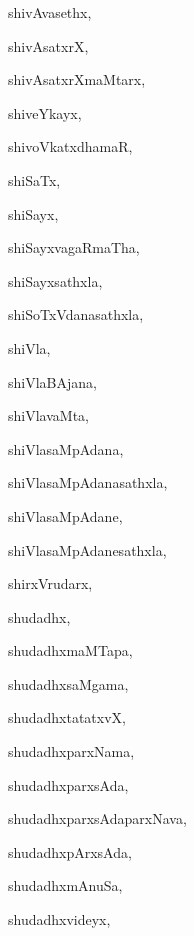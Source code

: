 \begin{multicols}{3}
{\noindent
{shivAvasethx}, \pageref{shivAvasethx}

\noindent
{shivAsatxrX}, \pageref{shivAsatxrX}

\noindent
{shivAsatxrXmaMtarx}, \pageref{shivAsatxrXmaMtarx}

\noindent
{shiveYkayx}, \pageref{shiveYkayx}

\noindent
{shivoVkatxdhamaR}, \pageref{shivoVkatxdhamaR}

\noindent
{shiSaTx}, \pageref{shiSaTx}

\noindent
{shiSayx}, \pageref{shiSayx}

\noindent
{shiSayxvagaRmaTha}, \pageref{shiSayxvagaRmaTha}

\noindent
{shiSayxsathxla}, \pageref{shiSayxsathxla}

\noindent
{shiSoTxVdanasathxla}, \pageref{shiSoTxVdanasathxla}

\noindent
{shiVla}, \pageref{shiVla}

\noindent
{shiVlaBAjana}, \pageref{shiVlaBAjana}

\noindent
{shiVlavaMta}, \pageref{shiVlavaMta}

\noindent
{shiVlasaMpAdana}, \pageref{shiVlasaMpAdana}

\noindent
{shiVlasaMpAdanasathxla}, \pageref{shiVlasaMpAdanasathxla}

\noindent
{shiVlasaMpAdane}, \pageref{shiVlasaMpAdane}

\noindent
{shiVlasaMpAdanesathxla}, \pageref{shiVlasaMpAdanesathxla}

\noindent
{shirxVrudarx}, \pageref{shirxVrudarx}

\noindent
{shudadhx}, \pageref{shudadhx}

\noindent
{shudadhxmaMTapa}, \pageref{shudadhxmaMTapa}

\noindent
{shudadhxsaMgama}, \pageref{shudadhxsaMgama}

\noindent
{shudadhxtatatxvX}, \pageref{shudadhxtatatxvX}

\noindent
{shudadhxparxNama}, \pageref{shudadhxparxNama}

\noindent
{shudadhxparxsAda}, \pageref{shudadhxparxsAda}

\noindent
{shudadhxparxsAdaparxNava}, \pageref{shudadhxparxsAdaparxNava}

\noindent
{shudadhxpArxsAda}, \pageref{shudadhxpArxsAda}

\noindent
{shudadhxmAnuSa}, \pageref{shudadhxmAnuSa}

\noindent
{shudadhxvideyx}, \pageref{shudadhxvideyx}

}
\end{multicols}
